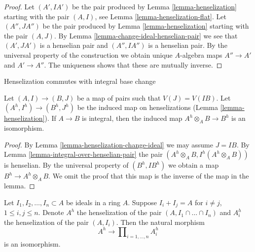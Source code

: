 \begin{proof}
Let $(A', IA')$ be the pair produced by Lemma \ref{lemma-henselization}
starting with the pair $(A, I)$, see Lemma \ref{lemma-henselization-flat}.
Let $(A'', JA'')$ be the pair produced by Lemma \ref{lemma-henselization}
starting with the pair $(A, J)$. By
Lemma \ref{lemma-change-ideal-henselian-pair} we see that
$(A', JA')$ is a henselian pair and $(A'', IA'')$ is a henselian pair.
By the universal property of the construction we obtain
unique $A$-algebra maps $A'' \to A'$ and $A' \to A''$. The
uniqueness shows that these are mutually inverse.
\end{proof}

\begin{lemma}
\label{lemma-henselization-integral}
\begin{slogan}
Henselization commutes with integral base change
\end{slogan}
Let $(A, I) \to (B, J)$ be a map of pairs such that $V(J) = V(IB)$.
Let $(A^h , I^h) \to (B^h, J^h)$ be the induced map
on henselizations (Lemma \ref{lemma-henselization}).
If $A \to B$ is integral, then the induced map
$A^h \otimes_A B \to B^h$ is an isomorphism.
\end{lemma}

\begin{proof}
By Lemma \ref{lemma-henselization-change-ideal} we may assume $J = IB$.
By Lemma \ref{lemma-integral-over-henselian-pair}
the pair $(A^h \otimes_A B, I^h(A^h \otimes_A B))$ is henselian.
By the universal property of $(B^h, IB^h)$ we obtain a map
$B^h \to A^h \otimes_A B$. We omit the proof
that this map is the inverse of the map in the lemma.
\end{proof}


\begin{lemma}
\label{lemma-CRT-henselization}
Let $I_1, I_2, \dots, I_n \subset A$ be ideals in a ring $A$.
Suppose $I_i + I_j = A$ for $i \not = j$, $1 \leq i, j \leq n$.
Denote $A^h$ the henselization of the pair $(A, I_1 \cap \ldots \cap I_n)$
and $A_i^h$ the henselization of the pair $(A, I_i)$.
Then the natural morphism
$$
A^h \to \prod\nolimits_{i = 1, \ldots, n} A^h_i
$$
is an isomorphism.
\end{lemma}

